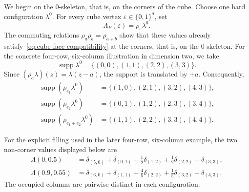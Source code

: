\documentclass[11pt,reqno]{amsart}
\numberwithin{equation}{section}
\theoremstyle{definition}
\theoremstyle{remark}
\newcommand{\supp}{\operatorname{supp}}
\begin{document}
We begin on the $0$-skeleton, that is, on the corners of the cube.
Choose one hard configuration $\lambda^0$.  For every cube vertex
$\varepsilon\in\{0,1\}^d$, set
\begin{equation}\label{eq:field-vertices}
 \Lambda_F(\varepsilon)=\rho_\varepsilon\lambda^0.
\end{equation}
The commuting relations $\rho_a\rho_b=\rho_{a+b}$ show that these values
already satisfy~\eqref{eq:cube-face-compatibility} at the corners, that is, on the $0$-skeleton.
For the concrete four-row, six-column illustration in dimension two, we take
\[
 \supp\lambda^0=\{(0,0),(1,1),(2,2),(3,3)\}.
\]
Since $(\rho_a\lambda)(z)=\lambda(z-a)$, the support is translated by $+a$.
Consequently,
\begin{align*}
 \supp(\rho_{e_1}\lambda^0)
   &=\{(1,0),(2,1),(3,2),(4,3)\},\\
 \supp(\rho_{e_2}\lambda^0)
   &=\{(0,1),(1,2),(2,3),(3,4)\},\\
 \supp(\rho_{e_1+e_2}\lambda^0)
   &=\{(1,1),(2,2),(3,3),(4,4)\}.
\end{align*}

For the explicit filling used in the later four-row, six-column example,
the two non-corner values displayed below are
\begin{align}
 \Lambda(0,0.5)
 &=\delta_{(5,0)}+\delta_{(0,1)}
   +\tfrac12\delta_{(1,2)}+\tfrac12\delta_{(2,2)}+\delta_{(3,3)},
 \label{eq:configuration-field-green}\\
 \Lambda(0.9,0.55)
 &=\delta_{(6,0)}+\delta_{(1,1)}
   +\tfrac45\delta_{(2,2)}+\tfrac15\delta_{(3,2)}+\delta_{(4,3)}.
 \label{eq:configuration-field-orange}
\end{align}
The occupied columns are pairwise distinct in each configuration.
\end{document}
